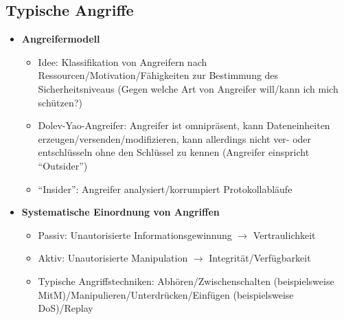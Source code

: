 \subsection{Typische Angriffe}
\begin{itemize}
	\item \textbf{Angreifermodell}
	\begin{itemize}
		\item Idee: Klassifikation von Angreifern nach Ressourcen/Motivation/Fähigkeiten zur Bestimmung des Sicherheitsniveaus (Gegen welche Art von Angreifer will/kann ich mich schützen?)
		\item Dolev-Yao-Angreifer: Angreifer ist omnipräsent, kann Dateneinheiten erzeugen/versenden/modifizieren, kann allerdings nicht ver- oder entschlüsseln ohne den Schlüssel zu kennen (Angreifer einspricht "`Outsider"')
		\item "`Insider"': Angreifer analysiert/korrumpiert Protokollabläufe
	\end{itemize}
	\item \textbf{Systematische Einordnung von Angriffen}
	\begin{itemize}
		\item Passiv: Unautorisierte Informationsgewinnung \(\rightarrow\) Vertraulichkeit
		\item Aktiv: Unautorisierte Manipulation \(\rightarrow\) Integrität/Verfügbarkeit
		\item Typische Angriffstechniken: Abhören/Zwischenschalten (beispielsweise MitM)/Manipulieren/Unterdrücken/Einfügen (beispielsweise DoS)/Replay
	\end{itemize}
\end{itemize}


